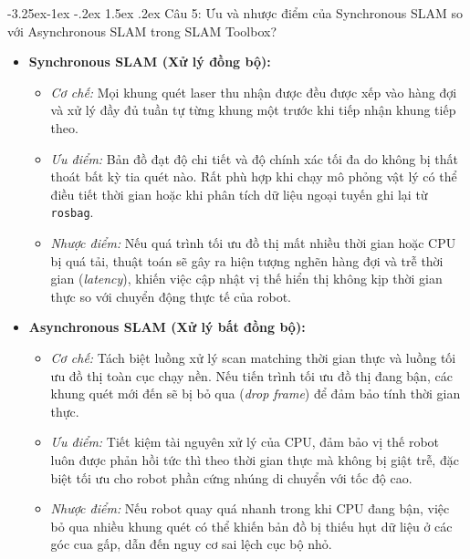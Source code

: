 \documentclass[11pt,a4paper]{article}
\makeatletter
\renewcommand{\subsection}{\@startsection{subsection}{2}{\z@}%
  {-3.25ex\@plus -1ex \@minus -.2ex}%
  {1.5ex \@plus .2ex}%
  {\normalfont\large\bfseries\color{secondary}}}
\makeatother
\begin{document}
\subsection{Câu 5: Ưu và nhược điểm của Synchronous SLAM so với Asynchronous SLAM trong SLAM Toolbox?}
\begin{itemize}
  \item \textbf{Synchronous SLAM (Xử lý đồng bộ):}
  \begin{itemize}
    \item \textit{Cơ chế:} Mọi khung quét laser thu nhận được đều được xếp vào hàng đợi và xử lý đầy đủ tuần tự từng khung một trước khi tiếp nhận khung tiếp theo.
    \item \textit{Ưu điểm:} Bản đồ đạt độ chi tiết và độ chính xác tối đa do không bị thất thoát bất kỳ tia quét nào. Rất phù hợp khi chạy mô phỏng vật lý có thể điều tiết thời gian hoặc khi phân tích dữ liệu ngoại tuyến ghi lại từ \texttt{rosbag}.
    \item \textit{Nhược điểm:} Nếu quá trình tối ưu đồ thị mất nhiều thời gian hoặc CPU bị quá tải, thuật toán sẽ gây ra hiện tượng nghẽn hàng đợi và trễ thời gian (\textit{latency}), khiến việc cập nhật vị thế hiển thị không kịp thời gian thực so với chuyển động thực tế của robot.
  \end{itemize}
  \item \textbf{Asynchronous SLAM (Xử lý bất đồng bộ):}
  \begin{itemize}
    \item \textit{Cơ chế:} Tách biệt luồng xử lý scan matching thời gian thực và luồng tối ưu đồ thị toàn cục chạy nền. Nếu tiến trình tối ưu đồ thị đang bận, các khung quét mới đến sẽ bị bỏ qua (\textit{drop frame}) để đảm bảo tính thời gian thực.
    \item \textit{Ưu điểm:} Tiết kiệm tài nguyên xử lý của CPU, đảm bảo vị thế robot luôn được phản hồi tức thì theo thời gian thực mà không bị giật trễ, đặc biệt tối ưu cho robot phần cứng nhúng di chuyển với tốc độ cao.
    \item \textit{Nhược điểm:} Nếu robot quay quá nhanh trong khi CPU đang bận, việc bỏ qua nhiều khung quét có thể khiến bản đồ bị thiếu hụt dữ liệu ở các góc cua gấp, dẫn đến nguy cơ sai lệch cục bộ nhỏ.
  \end{itemize}
\end{itemize}

\newpage
\end{document}
